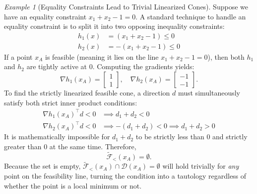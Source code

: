 \documentclass[11pt]{article}
\theoremstyle{definition}
\theoremstyle{plain}
\theoremstyle{remark}
\newtheorem{example}{Example}
\begin{document}
\begin{example}[Equality Constraints Lead to Trivial Linearized Cones]
  Suppose we have an equality constraint $x_1 + x_2 - 1 = 0$. A standard technique to handle an equality constraint is to split it into two opposing inequality constraints:
  \begin{align*}
    h_1(x) &= (x_1 + x_2 - 1) \leq 0 \\
    h_2(x) &= -(x_1 + x_2 - 1) \leq 0
  \end{align*}
  If a point $x_A$ is feasible (meaning it lies on the line $x_1 + x_2 - 1 = 0$), then both $h_1$ and $h_2$ are tightly active at $0$.
  Computing the gradients yields:
  \[
    \nabla h_1(x_A) = \begin{bmatrix} 1 \\ 1 \end{bmatrix}, \quad \nabla h_2(x_A) = \begin{bmatrix} -1 \\ -1 \end{bmatrix}.
  \]
  To find the strictly linearized feasible cone, a direction $d$ must simultaneously satisfy both strict inner product conditions:
  \begin{align*}
    \nabla h_1(x_A)^\top d < 0 &\implies d_1 + d_2 < 0 \\
    \nabla h_2(x_A)^\top d < 0 &\implies -(d_1 + d_2) < 0 \implies d_1 + d_2 > 0
  \end{align*}
  It is mathematically impossible for $d_1 + d_2$ to be strictly less than $0$ and strictly greater than $0$ at the same time. Therefore,
  \[
    \widetilde{\mathcal{F}}_{<}(x_A) = \emptyset.
  \]
  Because the set is empty, $\widetilde{\mathcal{F}}_{<}(x_A) \cap \mathcal{D}(x_A) = \emptyset$ will hold trivially for \emph{any} point on the feasibility line, turning the condition into a tautology regardless of whether the point is a local minimum or not.
\end{example}
\end{document}
